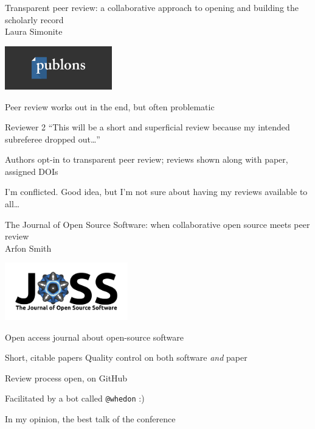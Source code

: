 \documentclass[11.5pt, aspectratio=169]{beamer}
\begin{document}
\begin{frame}{Transparent peer review: a collaborative approach to opening and building the scholarly record \\ {\small Laura Simonite}}
  \begin{center}
    \includegraphics[width=0.35\textwidth]{images/Publons_logo.png}
  \end{center}

  \begin{fullpageitemize}
    \item Peer review works out in the end, but often problematic
      \begin{itemize}
        \itemR Reviewer 2
        \itemR ``This will be a short and superficial review because my intended subreferee dropped out\ldots''
      \end{itemize}
    \item Authors opt-in to transparent peer review; reviews shown along with paper, assigned DOIs
    \item I'm conflicted. Good idea, but I'm not sure about having my reviews available to all\ldots
  \end{fullpageitemize}
\end{frame}

\begin{frame}[fragile]{The Journal of Open Source Software: when collaborative open source meets peer review\\ {\small Arfon Smith}}
  \begin{center}
    \includegraphics[width=0.4\textwidth]{images/joss.jpg}
  \end{center}

  \begin{fullpageitemize}
    \item Open access journal about open-source software
      \begin{itemize}
        \itemR Short, citable papers
        \itemR Quality control on both software \emph{and} paper
      \end{itemize}

    \item Review process open, on GitHub
      \begin{itemize}
        \itemR Facilitated by a bot called \verb+@whedon+ :)
      \end{itemize}

    \item In my opinion, the best talk of the conference
  \end{fullpageitemize}

\end{frame}
\end{document}
